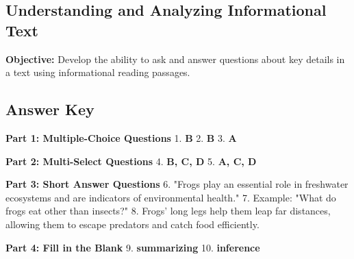 \documentclass[12pt]{article}
\begin{document}
\subsection*{Understanding and Analyzing Informational Text}
\onehalfspacing

\begin{tcolorbox}[colframe=black!40, colback=gray!0, title=Learning Objective]
\textbf{Objective:} Develop the ability to ask and answer questions about key details in a text using informational reading passages.
\end{tcolorbox}


\subsection*{Answer Key}

\textbf{Part 1: Multiple-Choice Questions}  
1. \textbf{B}  
2. \textbf{B}  
3. \textbf{A}  

\textbf{Part 2: Multi-Select Questions}  
4. \textbf{B, C, D}  
5. \textbf{A, C, D}  

\textbf{Part 3: Short Answer Questions}  
6. "Frogs play an essential role in freshwater ecosystems and are indicators of environmental health."  
7. Example: "What do frogs eat other than insects?"  
8. Frogs’ long legs help them leap far distances, allowing them to escape predators and catch food efficiently.  

\textbf{Part 4: Fill in the Blank}  
9. \textbf{summarizing}  
10. \textbf{inference}  
\end{document}
